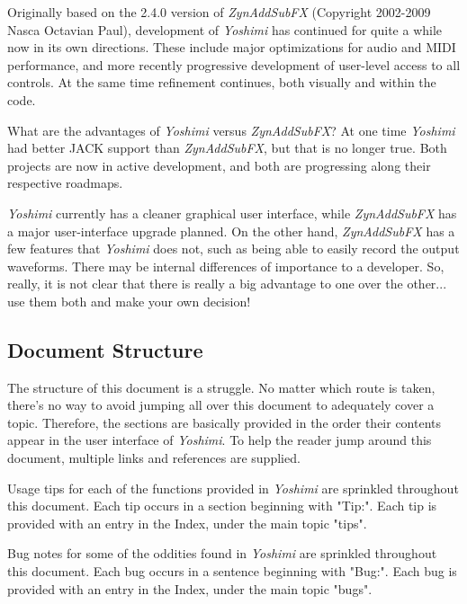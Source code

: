 \documentclass[
 11pt,
 twoside,
 a4paper,
 headinclude,
 footinclude,
 final                                 %
]{article}
\begin{document}
   Originally based on the 2.4.0 version of \textsl{ZynAddSubFX} (Copyright
   2002-2009 Nasca Octavian Paul), development of \textsl{Yoshimi} has
   continued for quite a while now in its own directions. These include
   major optimizations for audio and MIDI performance, and more recently
   progressive development of user-level access to all controls. At the same
   time refinement continues, both visually and within the code.

   What are the advantages of
   \textsl{Yoshimi} versus \textsl{ZynAddSubFX}?
   At one time \textsl{Yoshimi} had better JACK support
   than \textsl{ZynAddSubFX}, but that is no longer true.
   Both projects are now in active development, and both are
   progressing along their respective roadmaps.

   \textsl{Yoshimi} currently has a cleaner graphical user interface, while
   \textsl{ZynAddSubFX} has a major user-interface upgrade planned.
   On the other hand, \textsl{ZynAddSubFX} has a few features that
   \textsl{Yoshimi} does not, such as being able to easily record
   the output waveforms.  There may be internal differences of importance to
   a developer.  So, really, it is not clear that there is really a big
   advantage to one over the other... use them both and make your own
   decision!

\subsection{Document Structure}
\label{subsec:introduction_document_structure}

   The structure of this document is a struggle.  No matter which route is
   taken, there's no way to avoid jumping all over this document to
   adequately cover a topic.  Therefore, the sections are basically provided
   in the order their contents appear in the user interface of
   \textsl{Yoshimi}.  To help the reader jump around this document, multiple
   links and references are supplied.

   Usage tips
   for each of the functions provided in
   \textsl{Yoshimi} are sprinkled throughout this document.
   Each tip occurs in a section beginning with "Tip:".
   Each tip is provided with an entry in the Index, under the
   main topic "tips".

   Bug notes
   for some of the oddities found in \textsl{Yoshimi} are
   sprinkled throughout this document.
   Each bug occurs in a sentence beginning with "Bug:".
   Each bug is provided with an entry in the Index, under the
   main topic "bugs".
\end{document}
